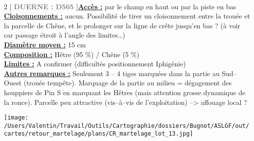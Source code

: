 \documentclass[a4paper,openany]{book}\usepackage[]{graphicx}\usepackage[]{color}
\begin{document}
\\\begin{multicols}{2}
[
\textbf{\textcolor{gray}{
\large DUERNE : D565
}}
]\noindent\textbf{\underline{Accès :}} par le champ en haut ou par la piste en bas\vspace{0.1cm} \\\noindent\textbf{\underline{Cloisonnements :}} aucun. Possibilité de tirer un cloisonnement entre la trouée et la parcelle de Chêne, et le prolonger sur la ligne de crête jusqu'en bas ? (à voir car passage étroit à l'angle des limites…)\vspace{0.1cm} \\\noindent\textbf{\underline{Diamètre moyen :}} 15 cm\vspace{0.1cm} \\\noindent\textbf{\underline{Composition :}} Hêtre (95 \%) / Chêne (5 \%)\vspace{0.1cm} \\\noindent\textbf{\underline{Limites :}} A confirmer (difficultés positionnement Iphigénie)\vspace{0.1cm} \\\noindent\textbf{\underline{Autres remarques :}} Seulement 3 -- 4 tiges marquées dans la partie au Sud--Ouest (trouée tempête). Marquage de la partie au milieu = dégagement des houppiers de Pin S en marquant les Hêtres (mais attention grosse dynamique de la ronce). Parcelle peu attractive (vis--à--vis de l'exploitation) --> affouage local ?\vspace{0.1cm} \\\end{multicols}\begin{center}
\texttt{[image: /Users/Valentin/Travail/Outils/Cartographie/dossiers/Bugnot/ASLGF/out/cartes/retour\_martelage/plans/CR\_martelage\_lot\_13.jpg]}
\end{center}\newpage\noindent
\end{document}
